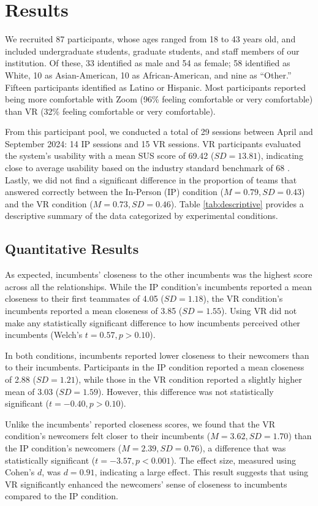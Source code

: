 \section{Results}
\label{results}
We recruited 87 participants, whose ages ranged from 18 to 43 years old, and included undergraduate students, graduate students, and staff members of our institution. Of these, 33 identified as male and 54 as female; 58 identified as White, 10 as Asian-American, 10 as African-American, and nine as ``Other.'' Fifteen participants identified as Latino or Hispanic. Most participants reported being more comfortable with Zoom (96\% feeling comfortable or very comfortable) than VR (32\% feeling comfortable or very comfortable). 

From this participant pool, we conducted a total of 29 sessions between April and September 2024: 14 IP sessions and 15 VR sessions. VR participants evaluated the system's usability with a mean SUS score of 69.42 ($SD=13.81$), indicating close to average usability based on the industry standard benchmark of 68 \cite{Lewis2018}. Lastly, we did not find a significant difference in the proportion of teams that answered correctly between the In-Person (IP) condition ($M=0.79, SD=0.43$) and the VR condition ($M=0.73, SD=0.46$). Table \ref{tab:descriptive} provides a descriptive summary of the data categorized by experimental conditions. 



\subsection{Quantitative Results}
As expected, incumbents' closeness to the other incumbents was the highest score across all the relationships. While the IP condition's incumbents reported a mean closeness to their first teammates of 4.05 ($SD=1.18$), the VR condition's incumbents reported a mean closeness of 3.85 ($SD=1.55$). Using VR did not make any statistically significant difference to how incumbents perceived other incumbents (Welch's $t=0.57, p>0.10$). 

In both conditions, incumbents reported lower closeness to their newcomers than to their incumbents. Participants in the IP condition reported a mean closeness of 2.88 ($SD=1.21$), while those in the VR condition reported a slightly higher mean of 3.03 ($SD=1.59$). However, this difference was not statistically significant ($t=-0.40, p>0.10$). 

Unlike the incumbents' reported closeness scores, we found that the VR condition's newcomers felt closer to their incumbents ($M=3.62, SD=1.70$) than the IP condition's newcomers ($M=2.39, SD=0.76$), a difference that was statistically significant ($t=-3.57, p < 0.001$). The effect size, measured using Cohen's $d$, was $d=0.91$, indicating a large effect. This result suggests that using VR significantly enhanced the newcomers' sense of closeness to incumbents compared to the IP condition.

